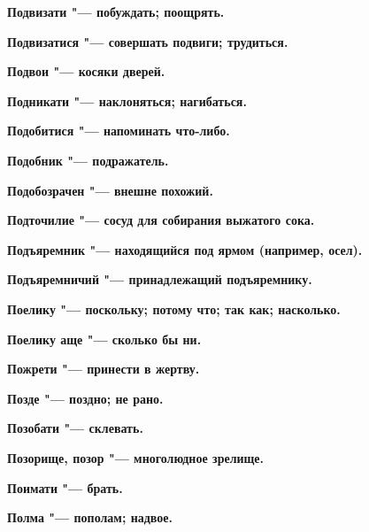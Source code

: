 \begin{multicols}{2}
\bfseries Подвизати\normalfont{} "--- побуждать; поощрять. 




\bfseries Подвизатися\normalfont{} "--- совершать подвиги; трудиться. 




\bfseries Подвои\normalfont{} "--- косяки дверей. 




\bfseries Подникати\normalfont{} "--- наклоняться; нагибаться. 




\bfseries Подобитися\normalfont{} "--- напоминать что-либо. 




\bfseries Подобник\normalfont{} "--- подражатель. 




\bfseries Подобозрачен\normalfont{} "--- внешне похожий. 




\bfseries Подточилие\normalfont{} "--- сосуд для собирания выжатого сока. 




\bfseries Подъяремник\normalfont{} "--- находящийся под ярмом (например, осел). 




\bfseries Подъяремничий\normalfont{} "--- принадлежащий подъяремнику. 




\bfseries Поелику\normalfont{} "--- поскольку; потому что; так как; насколько. 




\bfseries Поелику аще\normalfont{} "--- сколько бы ни. 




\bfseries Пожрети\normalfont{} "--- принести в жертву. 




\bfseries Позде\normalfont{} "--- поздно; не рано. 




\bfseries Позобати\normalfont{} "--- склевать. 




\bfseries Позорище, позор\normalfont{} "--- многолюдное зрелище. 




\bfseries Поимати\normalfont{} "--- брать. 




\bfseries Полма\normalfont{} "--- пополам; надвое. 





\end{multicols}
